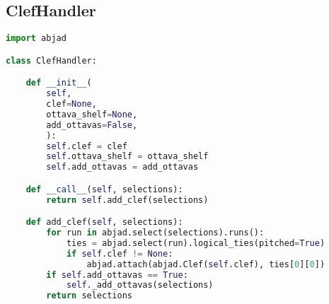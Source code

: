 \subsection{ClefHandler}

\pagestyle{fancy}
\renewcommand\headrulewidth{0pt}
\lhead{}\chead{}\rhead{\thepage}
\cfoot{}

\singlespace
\begin{lstlisting}[language=Python, caption=ClefHandler]
import abjad

class ClefHandler:

    def __init__(
        self,
        clef=None,
        ottava_shelf=None,
        add_ottavas=False,
        ):
        self.clef = clef
        self.ottava_shelf = ottava_shelf
        self.add_ottavas = add_ottavas

    def __call__(self, selections):
        return self.add_clef(selections)

    def add_clef(self, selections):
        for run in abjad.select(selections).runs():
            ties = abjad.select(run).logical_ties(pitched=True)
            if self.clef != None:
                abjad.attach(abjad.Clef(self.clef), ties[0][0])
        if self.add_ottavas == True:
            self._add_ottavas(selections)
        return selections


\end{lstlisting}
